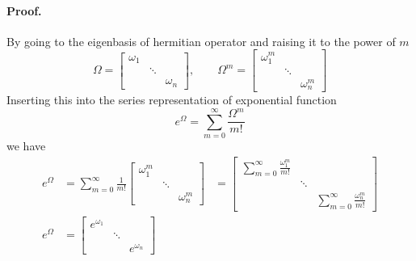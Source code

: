 \documentclass[../main.tex]{subfiles}
\begin{document}
\paragraph*{Proof.}
By going to the eigenbasis of hermitian operator and raising it to the power of $m$
\begin{equation*}
	\Omega=
	\begin{bmatrix}
		\omega_1 &        &          \\
		         & \ddots &          \\
		         &        & \omega_n
	\end{bmatrix},
	\qquad
	\Omega^m=
	\begin{bmatrix}
		\omega_1^m &        &            \\
		           & \ddots &            \\
		           &        & \omega_n^m
	\end{bmatrix}
\end{equation*}
Inserting this into the series representation of exponential function
\begin{equation*}
	e^\Omega=\sum_{m=0}^{\infty}\frac{\Omega^m}{m!}
\end{equation*}
we have
\begin{align*}
	e^\Omega & =\sum_{m=0}^{\infty}\frac{1}{m!}
	\begin{bmatrix}
		\omega_1^m &        &            \\
		           & \ddots &            \\
		           &        & \omega_n^m
	\end{bmatrix}
	         & =
	\begin{bmatrix}
		\sum_{m=0}^{\infty}\frac{\omega_1^m }{m!} &        &                                          \\
		                                          & \ddots &                                          \\
		                                          &        & \sum_{m=0}^{\infty}\frac{\omega_n^m}{m!}
	\end{bmatrix} \\
	e^\Omega & =
	\begin{bmatrix}
		e^{\omega_1} &        &            \\
		           & \ddots &            \\
		           &        & e^{\omega_n}
	\end{bmatrix}
\end{align*}
\end{document}
